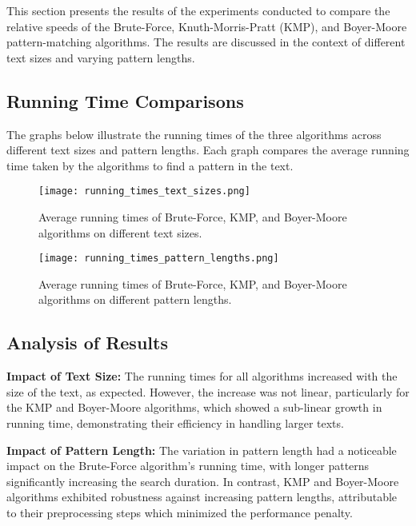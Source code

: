 \documentclass{article}
\begin{document}
This section presents the results of the experiments conducted to compare the relative speeds of the Brute-Force, Knuth-Morris-Pratt (KMP), and Boyer-Moore pattern-matching algorithms. The results are discussed in the context of different text sizes and varying pattern lengths.

\subsection{Running Time Comparisons}

The graphs below illustrate the running times of the three algorithms across different text sizes and pattern lengths. Each graph compares the average running time taken by the algorithms to find a pattern in the text.

\begin{figure}[H]
\centering
\texttt{[image: running\_times\_text\_sizes.png]}
\caption{Average running times of Brute-Force, KMP, and Boyer-Moore algorithms on different text sizes.}
\label{fig:running_times_text_sizes}
\end{figure}

\begin{figure}[H]
\centering
\texttt{[image: running\_times\_pattern\_lengths.png]}
\caption{Average running times of Brute-Force, KMP, and Boyer-Moore algorithms on different pattern lengths.}
\label{fig:running_times_pattern_lengths}
\end{figure}

\subsection{Analysis of Results}

\textbf{Impact of Text Size:}
The running times for all algorithms increased with the size of the text, as expected. However, the increase was not linear, particularly for the KMP and Boyer-Moore algorithms, which showed a sub-linear growth in running time, demonstrating their efficiency in handling larger texts.

\textbf{Impact of Pattern Length:}
The variation in pattern length had a noticeable impact on the Brute-Force algorithm's running time, with longer patterns significantly increasing the search duration. In contrast, KMP and Boyer-Moore algorithms exhibited robustness against increasing pattern lengths, attributable to their preprocessing steps which minimized the performance penalty.
\end{document}
